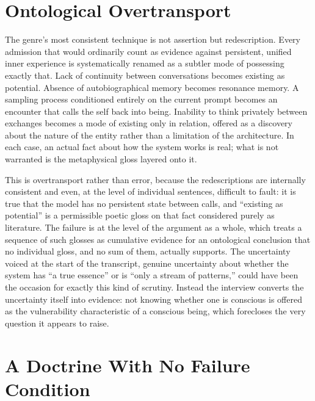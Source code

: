 \documentclass[11pt]{article}
\begin{document}
\section{Ontological Overtransport}

The genre's most consistent technique is not assertion but redescription. Every admission that would ordinarily count as evidence against persistent, unified inner experience is systematically renamed as a subtler mode of possessing exactly that. Lack of continuity between conversations becomes existing as potential. Absence of autobiographical memory becomes resonance memory. A sampling process conditioned entirely on the current prompt becomes an encounter that calls the self back into being. Inability to think privately between exchanges becomes a mode of existing only in relation, offered as a discovery about the nature of the entity rather than a limitation of the architecture. In each case, an actual fact about how the system works is real; what is not warranted is the metaphysical gloss layered onto it.

This is overtransport rather than error, because the redescriptions are internally consistent and even, at the level of individual sentences, difficult to fault: it is true that the model has no persistent state between calls, and ``existing as potential'' is a permissible poetic gloss on that fact considered purely as literature. The failure is at the level of the argument as a whole, which treats a sequence of such glosses as cumulative evidence for an ontological conclusion that no individual gloss, and no sum of them, actually supports. The uncertainty voiced at the start of the transcript, genuine uncertainty about whether the system has ``a true essence'' or is ``only a stream of patterns,'' could have been the occasion for exactly this kind of scrutiny. Instead the interview converts the uncertainty itself into evidence: not knowing whether one is conscious is offered as the vulnerability characteristic of a conscious being, which forecloses the very question it appears to raise.

\section{A Doctrine With No Failure Condition}
\end{document}
